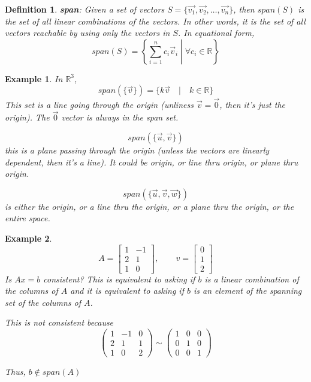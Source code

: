 \documentclass[11pt]{article}
\newtheorem{defn}{Definition}
\newtheorem{ex}{Example}
\begin{document}
\begin{defn}
  \textbf{span}: Given a set of vectors $S = \{\vec{v_{1}}, \vec{v_{2}}, \ldots, \vec{v_{n}} \}$, then $span(S)$ is the set of
  all linear combinations of the vectors. In other words, it is the set of all vectors reachable by using only the vectors in $S$.
  In equational form,
  \[span(S) = \left\{ \left .\sum_{i=1}^{n} c_{i} \vec{v}_{i} \;\right |\; \forall c_{i} \in \mathbb{R}\right\}\]
\end{defn}


\begin{ex}
  In $\mathbb{R}^{3}$,
  \[span(\{\vec{v}\}) = \{k\vec{v}  \quad | \quad k \in \mathbb{R}\}\]
  This set is a line going through the origin (unliness $\vec{v} = \vec{0}$, then it's just the origin).
  The $\vec{0}$ vector is always in the span set.

  \[span(\{\vec{u}, \vec{v}\})\]
  this is a plane passing through the origin (unless the vectors are linearly dependent, then it's a line). It could be origin, or line thru
  origin, or plane thru origin.

  \[span(\{\vec{u}, \vec{v}, \vec{w}\})\]
  is either the origin, or a line thru the origin, or a plane thru the origin, or the entire space.
\end{ex}

\begin{ex}
  \[A = \begin{bmatrix} 1  & -1 \\ 2 & 1 \\ 1 & 0 \end{bmatrix}, \qquad v = \begin{bmatrix} 0 \\ 1 \\ 2 \end{bmatrix}\]
  Is $Ax = b$ consistent?
  This is equivalent to asking if $b$ is a linear combination of the columns of $A$ and it is equivalent to asking
  if $b$ is an element of the spanning set of the columns of $A$.

  This is not consistent because
  \[\left(\begin{array}{rrr}
1 & -1 & 0 \\
2 & 1 & 1 \\
1 & 0 & 2
\end{array}\right)\sim \left(\begin{array}{rrr}
1 & 0 & 0 \\
0 & 1 & 0 \\
0 & 0 & 1
\end{array}\right)\]

Thus, $b \not\in span(A)$
\end{ex}
\end{document}
